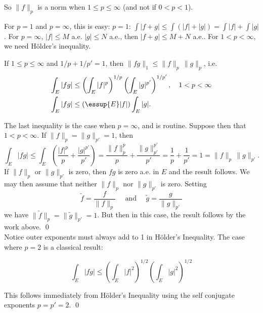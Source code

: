 So $\|f\|_p$ is a norm when $1 \leq p \leq \infty$ (and not if $0<p<1$). 

For $p=1$ and $p= \infty$, this is easy: $p=1$: $\int |f+g| \leq \int (|f|+|g|)= \int |f|+ \int |g|$. For $p=\infty$, $|f| \leq M$ a.e. $|g| \leq N$ a.e., then $|f+g| \leq M+N$ a.e.. For $1<p<\infty$, we need H\"older's inequality. 











\begin{thm} \label{thm:holder}
If $1 \leq p \leq \infty$ and $1/p+1/p'=1$, then $\|fg\|_1 \leq \|f\|_p\, \|g\|_p$, i.e.
	\[
	\begin{split}
	\int_E |fg| &\leq \left( \int_E |f|^p \right)^{1/p} \left( \int_E |g|^{p'} \right)^{1/p'}, \quad 1 < p < \infty \\
	\int_E |fg| &\leq (\essup{E} |f| ) \int_E |g|. 
	\end{split}
	\]
\end{thm}

\pf The last inequality is the case when $p= \infty$, and is routine. Suppose then that $1<p<\infty$. If $\|f\|_p= \|g\|_{p'}=1$, then
	\[
	\int_E |fg| \leq \int_E \left( \dfrac{|f|^p}{p} + \dfrac{|g|^{p'}}{p'} \right)= \dfrac{\|f\|_p^p}{p} + \dfrac{\|g\|^{p'}_{p'}}{p'}= \dfrac{1}{p} + \dfrac{1}{p'}= 1 = \|f\|_p \, \|g\|_{p'}.
	\]
If $\|f\|_p$ or $\|g\|_{p'}$ is zero, then $fg$ is zero a.e. in $E$ and the result follows. We may then assume that neither $\|f\|_p$ nor $\|g\|_{p'}$ is zero. Setting 
	\[
	\widetilde{f}= \dfrac{f}{\|f\|_p} \quad \text{ and } \quad \widetilde{g}= \dfrac{g}{\|g\|_{p'}}
	\]
we have $\|\widetilde{f}\|_p=\|\widetilde{g}\|_{p'}=1$. But then in this case, the result follows by the work above. \qed \\


Notice outer exponents must always add to 1 in H\"older's Inequality. The case where $p=2$ is a classical result:


\begin{cor} \label{cor:cs}
	\[ \int_E |fg| \leq \left( \int_E |f|^2 \right)^{1/2} \left( \int_E |g|^2 \right)^{1/2} \]
\end{cor}

\pf This follows immediately from H\"older's Inequality using the self conjugate exponents $p=p'=2$. \qed \\


